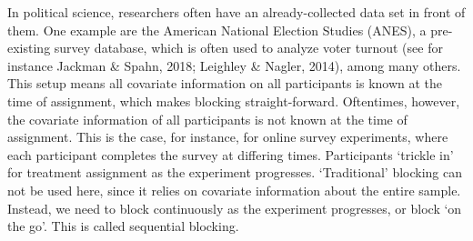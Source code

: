 \documentclass[12pt,econ]{sources/authesis}
\begin{document}
In political science, researchers often have an already-collected data set in front of them. One example are the American National Election Studies (ANES), a pre-existing survey database, which is often used to analyze voter turnout (see for instance Jackman \& Spahn, 2018; Leighley \& Nagler, 2014), among many others. This setup means all covariate information on all participants is known at the time of assignment, which makes blocking straight-forward. Oftentimes, however, the covariate information of all participants is not known at the time of assignment. This is the case, for instance, for online survey experiments, where each participant completes the survey at differing times. Participants `trickle in' for treatment assignment as the experiment progresses. `Traditional' blocking can not be used here, since it relies on covariate information about the entire sample. Instead, we need to block continuously as the experiment progresses, or block `on the go'. This is called sequential blocking.
\end{document}
